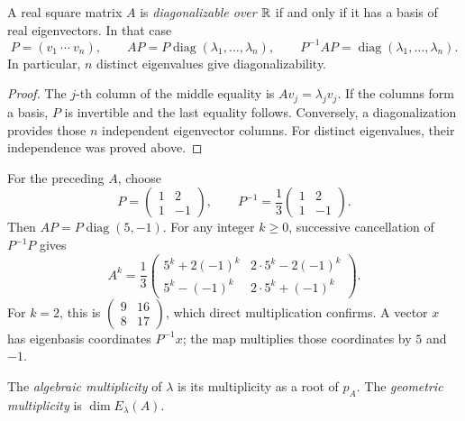 \begin{theorem}\label{thm:08:diagonal}
A real square matrix \(A\) is \emph{diagonalizable over \(\mathbb R\)} if
and only if it has a basis of real eigenvectors. In that case
\[
 P=(v_1\ \cdots\ v_n),\qquad
 AP=P\operatorname{diag}(\lambda_1,\ldots,\lambda_n),\qquad
 P^{-1}AP=\operatorname{diag}(\lambda_1,\ldots,\lambda_n).
\]
In particular, \(n\) distinct eigenvalues give diagonalizability.
\end{theorem}
\begin{proof}
The \(j\)-th column of the middle equality is \(Av_j=\lambda_jv_j\).
If the columns form a basis, \(P\) is invertible and the last equality
follows. Conversely, a diagonalization provides those \(n\) independent
eigenvector columns. For distinct eigenvalues, their independence was
proved above.
\end{proof}

\begin{example}
For the preceding \(A\), choose
\[
 P=\begin{pmatrix}1&2\\1&-1\end{pmatrix},\qquad
 P^{-1}=\frac13\begin{pmatrix}1&2\\1&-1\end{pmatrix}.
\]
Then \(AP=P\operatorname{diag}(5,-1)\). For any integer \(k\geqslant0\),
successive cancellation of \(P^{-1}P\) gives
\[
 A^k=\frac13
 \begin{pmatrix}
 5^k+2(-1)^k&2\cdot5^k-2(-1)^k\\
 5^k-(-1)^k&2\cdot5^k+(-1)^k
 \end{pmatrix}.
\]
For \(k=2\), this is \(\begin{pmatrix}9&16\\8&17\end{pmatrix}\), which
direct multiplication confirms. A vector \(x\) has eigenbasis coordinates
\(P^{-1}x\); the map multiplies those coordinates by \(5\) and \(-1\).
\end{example}

The \emph{algebraic multiplicity} of \(\lambda\) is its multiplicity as
a root of \(p_A\). The \emph{geometric multiplicity} is
\(\dim E_\lambda(A)\).

